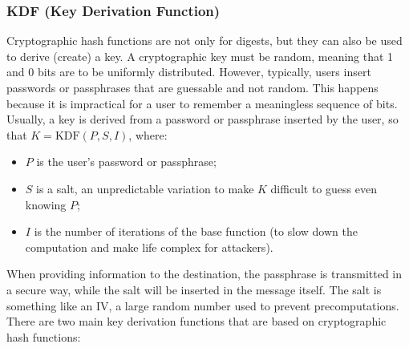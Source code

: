\subsubsection{KDF (Key Derivation Function)}
Cryptographic hash functions are not only for digests, but they can also be used to derive (create) a key.
A cryptographic key must be random, meaning that 1 and 0 bits are to be uniformly distributed. However, typically, users insert passwords or passphrases that are guessable and not random. This happens because it is impractical for a user to remember a meaningless sequence of bits. Usually, a key is derived from a password or passphrase inserted by the user, so that \(K = \text{KDF}(P, S, I)\), where:
\begin{itemize}
    \item \(P\) is the user's password or passphrase;
    \item \(S\) is a salt, an unpredictable variation to make \(K\) difficult to guess even knowing \(P\);
    \item \(I\) is the number of iterations of the base function (to slow down the computation and make life complex for attackers).
\end{itemize}

When providing information to the destination, the passphrase is transmitted in a secure way, while the salt will be inserted in the message itself. The salt is something like an IV, a large random number used to prevent precomputations.
There are two main key derivation functions that are based on cryptographic hash functions:

